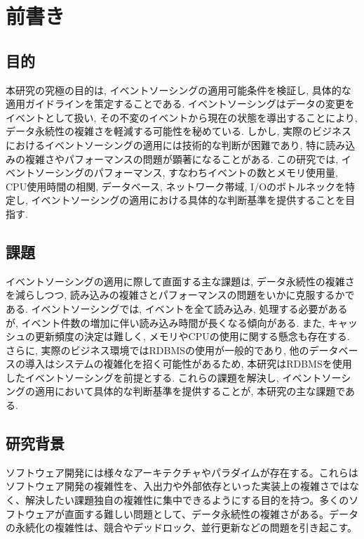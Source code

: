 \documentclass[../../main]{subfiles}
\begin{document}
    \section{前書き}\label{sec:preface}

    \subsection{目的}\label{subsec:preface-purpose}

    本研究の究極の目的は, イベントソーシングの適用可能条件を検証し, 具体的な適用ガイドラインを策定することである. イベントソーシングはデータの変更をイベントとして扱い, その不変のイベントから現在の状態を導出することにより, データ永続性の複雑さを軽減する可能性を秘めている. しかし, 実際のビジネスにおけるイベントソーシングの適用には技術的な判断が困難であり, 特に読み込みの複雑さやパフォーマンスの問題が顕著になることがある. この研究では, イベントソーシングのパフォーマンス, すなわちイベントの数とメモリ使用量, CPU使用時間の相関, データベース, ネットワーク帯域, I/Oのボトルネックを特定し, イベントソーシングの適用における具体的な判断基準を提供することを目指す.

    \subsection{課題}\label{subsec:preface-problem}

    イベントソーシングの適用に際して直面する主な課題は, データ永続性の複雑さを減らしつつ, 読み込みの複雑さとパフォーマンスの問題をいかに克服するかである. イベントソーシングでは, イベントを全て読み込み, 処理する必要があるが, イベント件数の増加に伴い読み込み時間が長くなる傾向がある. また, キャッシュの更新頻度の決定は難しく, メモリやCPUの使用に関する懸念も存在する. さらに, 実際のビジネス環境ではRDBMSの使用が一般的であり, 他のデータベースの導入はシステムの複雑化を招く可能性があるため, 本研究はRDBMSを使用したイベントソーシングを前提とする. これらの課題を解決し, イベントソーシングの適用において具体的な判断基準を提供することが, 本研究の主な課題である.

    \subsection{研究背景}\label{subsec:preface-motive}

    ソフトウェア開発には様々なアーキテクチャやパラダイムが存在する。これらはソフトウェア開発の複雑性を、入出力や外部依存といった実装上の複雑さではなく、解決したい課題独自の複雑性に集中できるようにする目的を持つ。多くのソフトウェアが直面する難しい問題として、データ永続性の複雑さがある。データの永続化の複雑性は、競合やデッドロック、並行更新などの問題を引き起こす。
\end{document}
